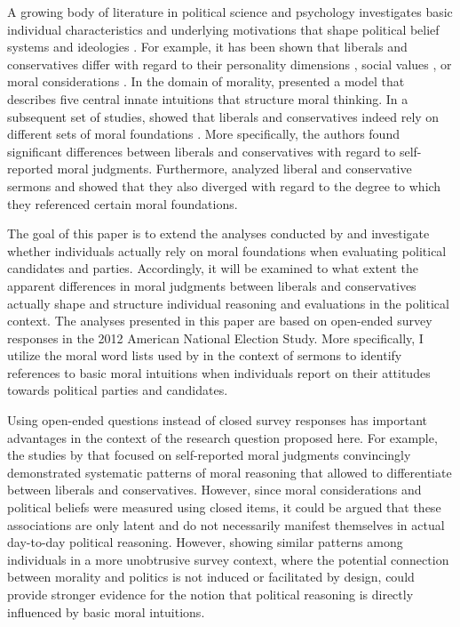 \documentclass[12pt]{paper}
\begin{document}
A growing body of literature in political science and psychology investigates basic individual characteristics and underlying motivations that shape political belief systems and ideologies \citep[c.f.][]{jost2003political,jost2006end,jost2009political}. For example, it has been shown that liberals and conservatives differ with regard to their personality dimensions \citep{gerber2010personality,hirsh2010compassionate,de2013personality}, social values \citep{schwartz2010basic,schwartz2011basic,piurko2011basic}, or moral considerations \citep{lakoff1995metaphor,haidt2008moral,mcadams2008family}. In the domain of morality, \citet{haidt2008moral} presented a model that describes five central innate intuitions that structure moral thinking. In a subsequent set of studies, \citet{graham2009liberals} showed that liberals and conservatives indeed rely on different sets of moral foundations \citep[see also][]{haidt2007morality}. More specifically, the authors found significant differences between liberals and conservatives with regard to self-reported moral judgments. Furthermore, \citet{graham2009liberals} analyzed liberal and conservative sermons and showed that they also diverged with regard to the degree to which they referenced certain moral foundations.

The goal of this paper is to extend the analyses conducted by \citet{graham2009liberals} and investigate whether individuals actually rely on moral foundations when evaluating political candidates and parties. Accordingly, it will be examined to what extent the apparent differences in moral judgments between liberals and conservatives actually shape and structure individual reasoning and evaluations in the political context. The analyses presented in this paper are based on open-ended survey responses in the 2012 American National Election Study. More specifically, I utilize the moral word lists used by \citet{graham2009liberals} in the context of sermons to identify references to basic moral intuitions when individuals report on their attitudes towards political parties and candidates.

Using open-ended questions instead of closed survey responses has important advantages in the context of the research question proposed here. For example, the studies by \citet{graham2009liberals} that focused on self-reported moral judgments convincingly demonstrated systematic patterns of moral reasoning that allowed to differentiate between liberals and conservatives. However, since moral considerations and political beliefs were measured using closed items, it could be argued that these associations are only latent and do not necessarily manifest themselves in actual day-to-day political reasoning. However, showing similar patterns among individuals in a more unobtrusive survey context, where the potential connection between morality and politics is not induced or facilitated by design, could provide stronger evidence for the notion that political reasoning is directly influenced by basic moral intuitions.
\end{document}
